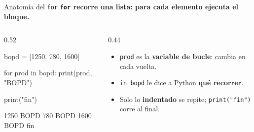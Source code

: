 \documentclass[aspectratio=169, 11pt]{beamer}
\begin{document}
\begin{frame}[fragile,shrink=18]{Anatomía del \texttt{for}}
  \vspace{-4pt}
  {\small\color{arcaDark}\bfseries
    \texttt{for} \textbf{recorre} una lista: para \textbf{cada} elemento ejecuta el bloque.}

  \vspace{5pt}
  \begin{columns}[T]
    \begin{column}{0.52\textwidth}
      \begin{pyblock}
bopd = [1250, 780, 1600]

for prod in bopd:
    print(prod, "BOPD")

print("fin")
      \end{pyblock}
      \vspace{2pt}
      \begin{outputblock}
1250 BOPD
780 BOPD
1600 BOPD
fin
      \end{outputblock}
    \end{column}

    \begin{column}{0.44\textwidth}
      {\scriptsize\color{textMuted}
      \begin{itemize}\setlength{\itemsep}{4pt}
        \item[{\color{arcaRed}\scriptsize\faArrowRight}]
          \texttt{prod} es la \textbf{variable de bucle}:
          cambia en cada vuelta.
        \item[{\color{arcaRed}\scriptsize\faArrowRight}]
          \texttt{in bopd} le dice a Python
          \textbf{qué recorrer}.
        \item[{\color{arcaRed}\scriptsize\faArrowRight}]
          Solo lo \textbf{indentado} se repite;
          \texttt{print("fin")} corre al final.
      \end{itemize}
      }
    \end{column}
  \end{columns}
\end{frame}
\end{document}
